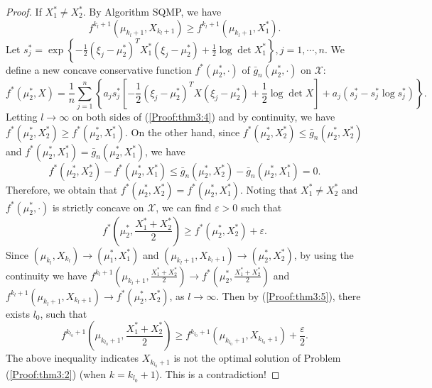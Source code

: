 \begin{proof}
If $X_1^*\not=X_2^*$. By Algorithm SQMP, we have
\begin{equation}\label{Proof:thm3:4}
f^{k_l+1}(\mu_{k_l+1},X_{k_l+1})\ge f^{k_l+1}(\mu_{k_l+1},X_1^*).
\end{equation}
Let $s_j^*=
\exp\left\{-\frac{1}{2}(\xi_j-\mu_2^*)^TX_1^*(\xi_j-\mu_2^*)+
\frac{1}{2}\log\det X_1^*\right\}, j=1,\cdots,n$. We define a new
concave conservative function $f^*(\mu_2^*,\cdot)$ of $\bar
g_n(\mu_2^*,\cdot)$ on $\mathcal{X}$:
\begin{equation*}
f^*(\mu_2^*,X)=\frac{1}{n}\sum_{j=1}^n
\left\{a_js_j^*\left[-\frac{1}{2}(\xi_j-\mu_2^*)^TX(\xi_j-\mu_2^*)
+\frac{1}{2}\log\det X\right]+a_j\left(s_j^*-s_j^*\log
s_j^*\right)\right\}.
\end{equation*}
Letting $l\to \infty$ on both sides of (\ref{Proof:thm3:4}) and by
continuity, we have $f^*(\mu_2^*,X_2^*)\ge f^*(\mu_2^*,X_1^*)$. On
the other hand, since $f^*(\mu_2^*,X_2^*)\le \bar
g_n(\mu_2^*,X_2^*)$ and $f^*(\mu_2^*,X_1^*)=\bar
g_n(\mu_2^*,X_1^*)$, we have \[f^*(\mu_2^*,X_2^*)-
f^*(\mu_2^*,X_1^*)\le \bar g_n(\mu_2^*,X_2^*)-\bar
g_n(\mu_2^*,X_1^*)=0.\] Therefore, we obtain that
$f^*(\mu_2^*,X_2^*)=f^*(\mu_2^*,X_1^*)$. Noting that
$X_1^*\not=X_2^*$ and $f^*(\mu_2^*,\cdot)$ is strictly concave on
$\mathcal{X}$, we can find $\varepsilon>0$ such that
\begin{equation}\label{Proof:thm3:5}
f^*\left(\mu_2^*,\frac{X_1^*+X_2^*}{2}\right)\ge
f^*\left(\mu_2^*,X_2^*\right)+\varepsilon.
\end{equation}
Since $(\mu_{k_l},X_{k_l})\to (\mu_1^*,X_1^*)$ and
$(\mu_{k_l+1},X_{k_l+1})\to (\mu_2^*,X_2^*)$, by using the
continuity we have $f^{k_l+1}(\mu_{k_l+1},\frac{X_1^*+X_2^*}{2})\to
f^*(\mu_2^*,\frac{X_1^*+X_2^*}{2})$ and
$f^{k_l+1}(\mu_{k_l+1},X_{k_l+1})\to f^*(\mu_2^*,X_2^*)$, as $l \to
\infty$. Then by (\ref{Proof:thm3:5}), there exists $l_0$, such that
\begin{equation*}
f^{k_{l_0}+1}\left(\mu_{k_{l_0}+1},\frac{X_1^*+X_2^*}{2}\right)\ge
f^{k_{l_0}+1}\left(\mu_{k_{l_0}+1},X_{k_{l_0}+1}\right)+
\frac{\varepsilon}{2}.
\end{equation*}
The above inequality indicates $X_{k_{l_0}+1}$ is not the optimal
solution of Problem (\ref{Proof:thm3:2}) (when $k=k_{l_0}+1$). This
is a contradiction!


\end{proof}
